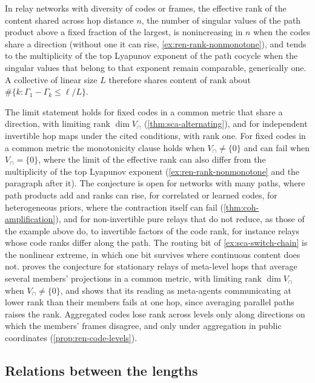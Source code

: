 \begin{conjecture}\label{conj:sca-rank-down}
In relay networks with diversity of codes or frames, the effective rank of the content shared across hop distance $n$, the number of singular values of the path product above a fixed fraction of the largest, is nonincreasing in $n$ when the codes share a direction (without one it can rise, \cref{ex:ren-rank-nonmonotone}), and tends to the multiplicity of the top Lyapunov exponent of the path cocycle when the singular values that belong to that exponent remain comparable, generically one. A collective of linear size $L$ therefore shares content of rank about $\#\{k:\Gamma_1-\Gamma_k\le\ell/L\}$.
\end{conjecture}
The limit statement holds for fixed codes in a common metric that share a direction, with limiting rank $\dim V_\cap$ (\cref{thm:sca-alternating}), and for independent invertible hop maps under the cited conditions, with rank one. For fixed codes in a common metric the monotonicity clause holds when $V_\cap\neq\{0\}$ and can fail when $V_\cap=\{0\}$, where the limit of the effective rank can also differ from the multiplicity of the top Lyapunov exponent (\cref{ex:ren-rank-nonmonotone} and the paragraph after it). The conjecture is open for networks with many paths, where path products add and ranks can rise, for correlated or learned codes, for heterogeneous priors, where the contraction itself can fail (\cref{thm:coh-amplification}), and for non-invertible pure relays that do not reduce, as those of the example above do, to invertible factors of the code rank, for instance relays whose code ranks differ along the path. The routing bit of \cref{ex:sca-switch-chain} is the nonlinear extreme, in which one bit survives where continuous content does not.  proves the conjecture for stationary relays of meta-level hops that average several members' projections in a common metric, with limiting rank $\dim V_\cap$ when $V_\cap\neq\{0\}$, and shows that its reading as meta-agents communicating at lower rank than their members fails at one hop, since averaging parallel paths raises the rank. Aggregated codes lose rank across levels only along directions on which the members' frames disagree, and only under aggregation in public coordinates (\cref{prop:ren-code-levels}).

\subsection{Relations between the lengths}\label{sup:sca-relations-between-the-lengths}

